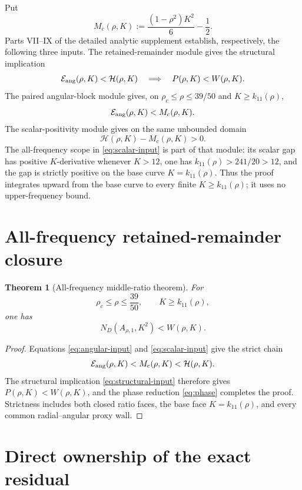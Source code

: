 \documentclass[11pt]{article}
\newtheorem{theorem}{Theorem}
\newcommand{\ND}{N_D}
\begin{document}
Put
\[
 M_c(\rho,K):=\frac{(1-\rho^2)K^2}{6}-\frac12.
\]
Parts VII--IX of the detailed analytic supplement establish, respectively,
the following three inputs.  The retained-remainder module gives the
structural implication
\begin{equation}
 \mathcal E_{\rm ang}(\rho,K)<\mathcal H(\rho,K)
 \quad\Longrightarrow\quad
 P(\rho,K)<W(\rho,K).
 \label{eq:structural-input}
\end{equation}
The paired angular-block module gives, on
\(\rho_c\leq\rho\leq39/50\) and \(K\geq k_{11}(\rho)\),
\begin{equation}
 \mathcal E_{\rm ang}(\rho,K)<M_c(\rho,K).
 \label{eq:angular-input}
\end{equation}
The scalar-positivity module gives on the same unbounded domain
\begin{equation}
 \mathcal H(\rho,K)-M_c(\rho,K)>0.
 \label{eq:scalar-input}
\end{equation}
The all-frequency scope in \eqref{eq:scalar-input} is part of that module:
its scalar gap has positive \(K\)-derivative whenever \(K>12\), one has
\(k_{11}(\rho)>241/20>12\), and the gap is strictly positive on the base
curve \(K=k_{11}(\rho)\).  Thus the proof integrates upward from the base
curve to every finite \(K\geq k_{11}(\rho)\); it uses no upper-frequency
bound.

\section{All-frequency retained-remainder closure}

\begin{theorem}[All-frequency middle-ratio theorem]
\label{thm:all-frequency}
For
\[
 \rho_c\leq\rho\leq\frac{39}{50},
 \qquad
 K\geq k_{11}(\rho),
\]
one has
\[
 \ND(A_{\rho,1},K^2)<W(\rho,K).
\]
\end{theorem}

\begin{proof}
Equations \eqref{eq:angular-input} and \eqref{eq:scalar-input} give the
strict chain
\[
 \mathcal E_{\rm ang}(\rho,K)
 <M_c(\rho,K)<\mathcal H(\rho,K).
\]
The structural implication \eqref{eq:structural-input} therefore gives
\(P(\rho,K)<W(\rho,K)\), and the phase reduction \eqref{eq:phase}
completes the proof.  Strictness includes both closed ratio faces, the base
face \(K=k_{11}(\rho)\), and every common radial--angular proxy wall.
\end{proof}

\section{Direct ownership of the exact residual}
\end{document}
